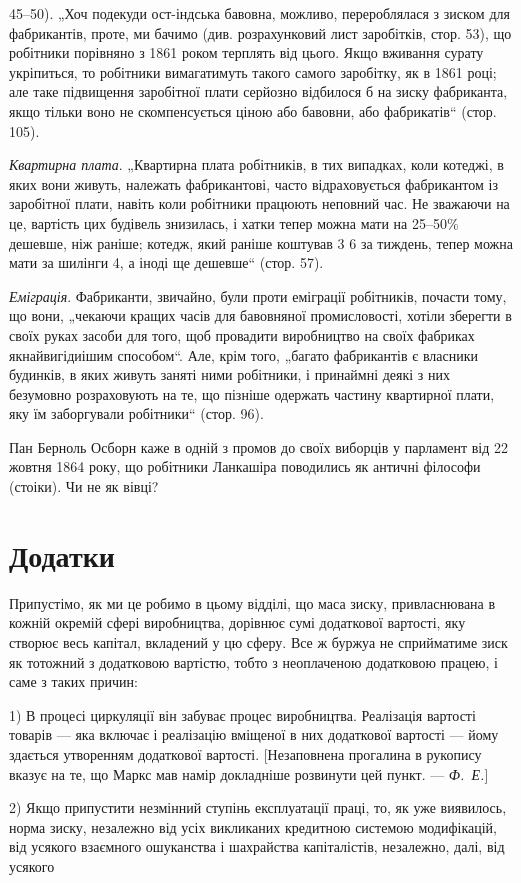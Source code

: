 \parcont{}  %
45--50). „Хоч подекуди ост-індська бавовна, можливо, перероблялася
з зиском для фабрикантів, проте, ми бачимо (див. розрахунковий
лист заробітків, стор. 53), що робітники порівняно
з 1861 роком терплять від цього. Якщо вживання сурату укріпиться,
то робітники вимагатимуть такого самого заробітку, як
в 1861 році; але таке підвищення заробітної плати серйозно
відбилося б на зиску фабриканта, якщо тільки воно не скомпенсується
ціною або бавовни, або фабрикатів“ (стор. 105).

\emph{Квартирна плата}. „Квартирна плата робітників, в тих випадках,
коли котеджі, в яких вони живуть, належать фабрикантові,
часто відраховується фабрикантом із заробітної плати,
навіть коли робітники працюють неповний час. Не зважаючи
на це, вартість цих будівель знизилась, і хатки тепер можна
мати на 25--50\% дешевше, ніж раніше; котедж, який раніше
коштував 3 6 за тиждень, тепер можна мати за шилінги 4, а іноді ще дешевше“ (стор. 57).

\emph{Еміграція}. Фабриканти, звичайно, були проти еміграції робітників,
почасти тому, що вони, „чекаючи кращих часів для бавовняної
промисловості, хотіли зберегти в своїх руках засоби
для того, щоб провадити виробництво на своїх фабриках якнайвигідиішим
способом“. Але, крім того, „багато фабрикантів
є власники будинків, в яких живуть заняті ними робітники,
і принаймні деякі з них безумовно розраховують на те, що
пізніше одержать частину квартирної плати, яку їм заборгували
робітники“ (стор. 96).

Пан Берноль Осборн каже в одній з промов до своїх виборців
у парламент від 22 жовтня 1864 року, що робітники
Ланкашіра поводились як античні філософи (стоіки). Чи не як вівці?

\section{Додатки}

Припустімо, як ми це робимо в цьому відділі, що маса
зиску, привласнювана в кожній окремій сфері виробництва, дорівнює
сумі додаткової вартості, яку створює весь капітал, вкладений
у цю сферу. Все ж буржуа не сприйматиме зиск як тотожний
з додатковою вартістю, тобто з неоплаченою додатковою
працею, і саме з таких причин:

1) В процесі циркуляції він забуває процес виробництва.
Реалізація вартості товарів — яка включає і реалізацію вміщеної
в них додаткової вартості — йому здається утворенням додаткової
вартості. [Незаповнена прогалина в рукопису вказує на те,
що Маркс мав намір докладніше розвинути цей пункт. — \emph{Ф.~Е.}]

2) Якщо припустити незмінний ступінь експлуатації праці, то,
як уже виявилось, норма зиску, незалежно від усіх викликаних
кредитною системою модифікацій, від усякого взаємного ошуканства
і шахрайства капіталістів, незалежно, далі, від усякого
\parbreak{}  %
